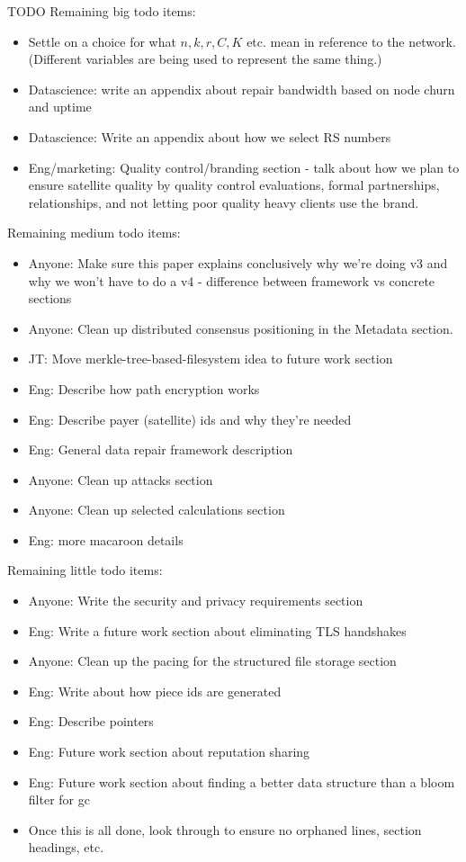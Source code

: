 \documentclass[a4paper,10pt]{article} \usepackage[utf8]{inputenc}
\newcommand{\todo}[1]{{\color{red} TODO #1 }}
\begin{document}
\todo{
Remaining big todo items:
\begin{itemize}
\item Settle on a choice for what $n,k,r,C,K$ etc. mean in reference to the 
network. (Different variables are being used to represent the same thing.)
\item Datascience: write an appendix about repair bandwidth based on node
  churn and uptime
\item Datascience: Write an appendix about how we select RS numbers
\item Eng/marketing: Quality control/branding section - talk about how we
  plan to ensure satellite quality by quality control evaluations, formal
  partnerships, relationships, and not letting poor quality heavy clients
  use the brand.
\end{itemize}

Remaining medium todo items:
\begin{itemize}
\item Anyone: Make sure this paper explains conclusively why we're doing v3 and
  why we won't have to do a v4 - difference between framework vs concrete
  sections
\item Anyone:
  Clean up distributed consensus positioning in the Metadata section.
\item JT: Move merkle-tree-based-filesystem idea to future work section
\item Eng: Describe how path encryption works
\item Eng: Describe payer (satellite) ids and why they're needed
\item Eng: General data repair framework description
\item Anyone: Clean up attacks section
\item Anyone: Clean up selected calculations section
\item Eng: more macaroon details
\end{itemize}

Remaining little todo items:
\begin{itemize}
\item Anyone: Write the security and privacy requirements section
\item Eng: Write a future work section about eliminating TLS handshakes
\item Anyone: Clean up the pacing for the structured file storage section
\item Eng: Write about how piece ids are generated
\item Eng: Describe pointers
\item Eng: Future work section about reputation sharing
\item Eng: Future work section about finding a better data structure than
 a bloom filter for gc
\item Once this is all done, look through to ensure no orphaned lines, 
section headings, etc.
\end{itemize}
}
\end{document}

